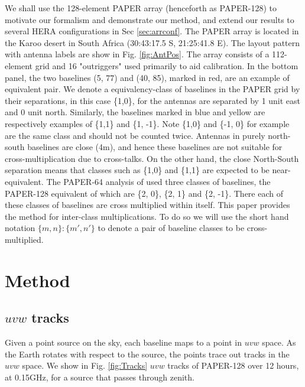 \documentclass[twocolumn,apj,numberedappendix]{emulateapj}
\renewcommand\[{\begin{equation}}
\renewcommand\]{\end{equation}}
\begin{document}
We shall use the 128-element PAPER array (henceforth as PAPER-128) to motivate our formalism and demonstrate our method, and extend our results to several HERA configurations in Sec \ref{sec:arrconf}. 
The PAPER array is located in the Karoo desert in South Africa (30:43:17.5
S, 21:25:41.8 E). The layout pattern with antenna labels are show
in Fig. \ref{fig:AntPos}. The array consists of a 112-element grid and 16 "outriggers" used primarily to aid calibration.  In the bottom panel, the two baselines (5, 77) and (40, 85), marked in red, are an example of equivalent pair. We denote a equivalency-class of baselines in the PAPER grid by their separations, in this case  \{1,0\}, for the
antennas are separated by 1 unit east and 0 unit north. Similarly,
the baselines marked in blue and yellow are respectively examples
of \{1,1\} and \{1, -1\}.
Note \{1,0\} and \{-1, 0\} for example are the same class and should
not be counted twice. Antennas in purely north-south baselines
are close (4m), and hence these baselines are not suitable
for cross-multiplication due to cross-talks. On the other hand, the close North-South separation means that classes such as \{1,0\} and  \{1,1\} are expected to be near-equivalent. The PAPER-64 analysis of \cite{Ali2015} used three classes of baselines, the PAPER-128
equivalent of which are 
\{2, 0\}, \{2, 1\} and \{2, -1\}. There each of these classes
of baselines are cross multiplied within itself. This paper provides the method for inter-class multiplications. To do so we will use the short hand notation $\{m,n\}:\{m',n'\}$ to denote a pair of baseline classes to be cross-multiplied. 


\section{Method \label{sec:method}}\label{sec:method}

\subsection{$uvw$ tracks \label{sec:tracks}}



Given a point source on the sky, each baseline maps to a point in $uvw$ space. As the Earth rotates with respect to
the source, the points trace out tracks in the $uvw$ space. 
We show in Fig. \ref{fig:Tracks} $uvw$ tracks of PAPER-128 over 12 hours, at 0.15GHz, for a source that passes through zenith. 
\end{document}
